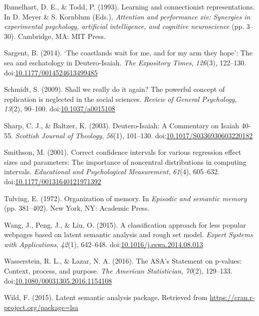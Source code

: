 \documentclass[english,man]{apa6}
\theoremstyle{definition}
\theoremstyle{definition}
\theoremstyle{definition}
\theoremstyle{remark}
\begin{document}
\hypertarget{ref-Meyer1993}{}
Rumelhart, D. E., \& Todd, P. (1993). Learning and connectionist
representations. In D. Meyer \& S. Kornblum (Eds.), \emph{Attention and
performance xiv: Synergies in experimental psychology, artificial
intelligence, and cognitive neuroscience} (pp. 3--30). Cambridge, MA:
MIT Press.

\hypertarget{ref-Sargent2013}{}
Sargent, B. (2014). `The coastlands wait for me, and for my arm they
hope': The sea and eschatology in Deutero-Isaiah. \emph{The Expository
Times}, \emph{126}(3), 122--130.
doi:\href{https://doi.org/10.1177/0014524613499485}{10.1177/0014524613499485}

\hypertarget{ref-Schmidt2009}{}
Schmidt, S. (2009). Shall we really do it again? The powerful concept of
replication is neglected in the social sciences. \emph{Review of General
Psychology}, \emph{13}(2), 90--100.
doi:\href{https://doi.org/10.1037/a0015108}{10.1037/a0015108}

\hypertarget{ref-Baltzer2001}{}
Sharp, C. J., \& Baltzer, K. (2003). Deutero-Isaiah: A Commentary on
Isaiah 40-55. \emph{Scottish Journal of Theology}, \emph{56}(1),
101--130.
doi:\href{https://doi.org/10.1017/S0336930603220182}{10.1017/S0336930603220182}

\hypertarget{ref-Smithson2001}{}
Smithson, M. (2001). Correct confidence intervals for various regression
effect sizes and parameters: The importance of noncentral distributions
in computing intervals. \emph{Educational and Psychological
Measurement}, \emph{61}(4), 605--632.
doi:\href{https://doi.org/10.1177/00131640121971392}{10.1177/00131640121971392}

\hypertarget{ref-Tulving1972}{}
Tulving, E. (1972). Organization of memory. In \emph{Episodic and
semantic memory} (pp. 381--402). New York, NY: Academic Press.

\hypertarget{ref-Wang2015}{}
Wang, J., Peng, J., \& Liu, O. (2015). A classification approach for
less popular webpages based on latent semantic analysis and rough set
model. \emph{Expert Systems with Applications}, \emph{42}(1), 642--648.
doi:\href{https://doi.org/10.1016/j.eswa.2014.08.013}{10.1016/j.eswa.2014.08.013}

\hypertarget{ref-Wasserstein2016}{}
Wasserstein, R. L., \& Lazar, N. A. (2016). The ASA's Statement on
p-values: Context, process, and purpose. \emph{The American
Statistician}, \emph{70}(2), 129--133.
doi:\href{https://doi.org/10.1080/00031305.2016.1154108}{10.1080/00031305.2016.1154108}

\hypertarget{ref-Wild2015}{}
Wild, F. (2015). Latent semantic analysis package. Retrieved from
\url{https://cran.r-project.org/package=lsa}
\end{document}
